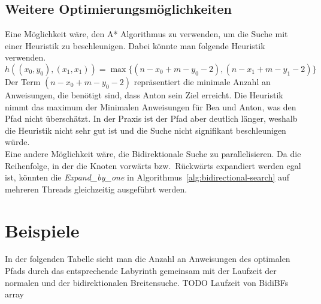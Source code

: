 \documentclass[a4paper,10pt,ngerman]{scrartcl}
\begin{document}
    \subsection{Weitere Optimierungsmöglichkeiten}
    Eine Möglichkeit wäre, den A* Algorithmus zu verwenden, um die Suche mit einer Heuristik zu beschleunigen.
    Dabei könnte man folgende Heuristik verwenden.
    \[h((x_0, y_0), (x_1, x_1)) = \max\{(n - x_0 + m - y_0 - 2), (n - x_1 + m - y_1 - 2)\}\]
    Der Term $(n - x_0 + m - y_0 - 2)$ repräsentiert die minimale Anzahl an Anweisungen, die benötigt sind, dass Anton sein Ziel erreicht.
    Die Heuristik nimmt das maximum der Minimalen Anweisungen für Bea und Anton, was den Pfad nicht überschätzt.
    In der Praxis ist der Pfad aber deutlich länger, weshalb die Heuristik nicht sehr gut ist und die Suche nicht signifikant beschleunigen würde.\\

    Eine andere Möglichkeit wäre, die Bidirektionale Suche zu parallelisieren.
    Da die Reihenfolge, in der die Knoten vorwärts bzw.\ Rückwärts expandiert werden egal ist, könnten die \textit{Expand\_by\_one} in Algorithmus~\ref{alg:bidirectional-search} auf mehreren Threads gleichzeitig ausgeführt werden.


    \section{Beispiele}
    In der folgenden Tabelle sieht man die Anzahl an Anweisungen des optimalen Pfads durch das entsprechende Labyrinth gemeinsam mit der Laufzeit der normalen und der bidirektionalen Breitensuche. TODO Laufzeit von BidiBFs array \\
\end{document}
